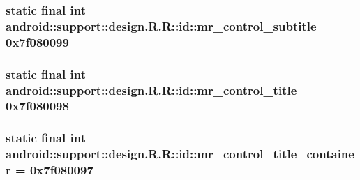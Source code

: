 \hypertarget{classandroid_1_1support_1_1design_1_1_r_1_1id_82a8f79445690faa380ca137c2c74146}{
\subsubsection[{mr\_\-control\_\-subtitle}]{\setlength{\rightskip}{0pt plus 5cm}static final int android::support::design.R.R::id::mr\_\-control\_\-subtitle = 0x7f080099}}
\label{classandroid_1_1support_1_1design_1_1_r_1_1id_82a8f79445690faa380ca137c2c74146}


\hypertarget{classandroid_1_1support_1_1design_1_1_r_1_1id_a08059b80e5810264e57b5756b499635}{
\subsubsection[{mr\_\-control\_\-title}]{\setlength{\rightskip}{0pt plus 5cm}static final int android::support::design.R.R::id::mr\_\-control\_\-title = 0x7f080098}}
\label{classandroid_1_1support_1_1design_1_1_r_1_1id_a08059b80e5810264e57b5756b499635}


\hypertarget{classandroid_1_1support_1_1design_1_1_r_1_1id_a57d59af029af5ada378f7fec66cbb3c}{
\subsubsection[{mr\_\-control\_\-title\_\-container}]{\setlength{\rightskip}{0pt plus 5cm}static final int android::support::design.R.R::id::mr\_\-control\_\-title\_\-container = 0x7f080097}}
\label{classandroid_1_1support_1_1design_1_1_r_1_1id_a57d59af029af5ada378f7fec66cbb3c}


